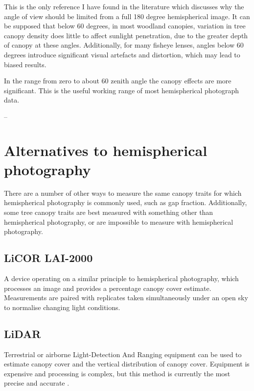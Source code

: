 \documentclass{article}
\begin{document}
This is the only reference I have found in the literature which discusses why the angle of view should be limited from a full 180 degree hemispherical image. It can be supposed that below 60 degrees, in most woodland canopies, variation in tree canopy density does little to affect sunlight penetration, due to the greater depth of canopy at these angles. Additionally, for many fisheye lenses, angles below 60 degrees introduce significant visual artefacts and distortion, which may lead to biased results. 

\begin{minipage}{\linewidth}
\begin{framed}
In the range from zero to about 60 zenith angle the canopy effects are more significant. This is the useful working range of most hemispherical photograph data.

-- \citet{Jupp2009}
\end{framed}
\end{minipage}

\section{Alternatives to hemispherical photography}

There are a number of other ways to measure the same canopy traits for which hemispherical photography is commonly used, such as gap fraction. Additionally, some tree canopy traits are best measured with something other than hemispherical photography, or are impossible to measure with hemispherical photography.

\subsection{LiCOR LAI-2000}

A device operating on a similar principle to hemispherical photography, which processes an image and provides a percentage canopy cover estimate. Measurements are paired with replicates taken simultaneously under an open sky to normalise changing light conditions.

\subsection{LiDAR}

Terrestrial or airborne Light-Detection And Ranging equipment can be used to estimate canopy cover and the vertical distribution of canopy cover. Equipment is expensive and processing is complex, but this method is currently the most precise and accurate \citep{Seidel2011}.
\end{document}

